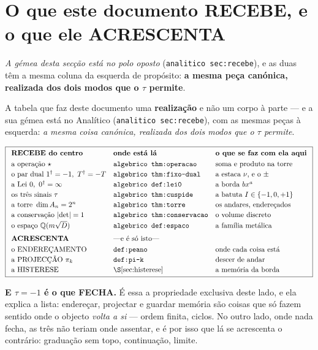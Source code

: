 \documentclass[11pt,a4paper]{article}
\newcommand{\abs}[1]{\lvert #1\rvert}
\newcommand{\dg}{^{\dagger}}
\newcommand{\code}[1]{\texttt{#1}}
\begin{document}
\section{O que este documento RECEBE, e o que ele ACRESCENTA}\label{sec:recebe}

\noindent\emph{A gémea desta secção está no polo oposto} (\code{analitico sec:recebe}), e as
duas têm a mesma coluna da esquerda de propósito: \textbf{a mesma peça canónica, realizada
dos dois modos que o $\tau$ permite}.


A tabela que faz deste documento uma \textbf{realização} e não um corpo à parte --- e a
sua gémea está no Analítico (\code{analitico sec:recebe}), com as mesmas peças à esquerda:
\emph{a mesma coisa canónica, realizada dos dois modos que o $\tau$ permite}.

\[
\boxed{
\begin{array}{lll}
\textbf{RECEBE do centro} & \textbf{onde está lá} & \textbf{o que se faz com ela aqui}\\[3pt]
\text{a operação }\star & \code{algebrico thm:operacao} & \text{soma e produto na torre}\\[2pt]
\text{o par dual } 1\dg=-1,\ T\dg=-T & \code{algebrico thm:fixo-dual} & \text{a estaca }\nu\text{, e o }\pm\\[2pt]
\text{a Lei 0},\ 0\dg=\infty & \code{algebrico def:lei0} & \text{a borda }bx^{a}\\[2pt]
\text{os três sinais }\tau & \code{algebrico thm:cuspide} & \text{a batuta }I\in\{-1,0,+1\}\\[2pt]
\text{a torre } \dim A_n=2^n & \code{algebrico thm:torre} & \text{os andares, endereçados}\\[2pt]
\text{a conservação }\abs{\det}=1 & \code{algebrico thm:conservacao} & \text{o volume discreto}\\[2pt]
\text{o espaço } \mathbb{Q}(m\sqrt D) & \code{algebrico def:espaco} & \text{a família metálica}\\[6pt]
\textbf{ACRESCENTA} & \multicolumn{2}{l}{\text{---e é só isto---}}\\[3pt]
\text{o ENDEREÇAMENTO} & \code{def:peano} & \text{onde cada coisa está}\\[2pt]
\text{a PROJECÇÃO } \pi_k & \code{def:pi-k} & \text{descer de andar}\\[2pt]
\text{a HISTERESE} & \S\ref{sec:histerese} & \text{a memória da borda}
\end{array}}
\]

\noindent\textbf{E $\tau=-1$ é o que FECHA.} É essa a propriedade exclusiva deste lado, e
ela explica a lista: endereçar, projectar e guardar memória são coisas que só fazem sentido
onde o objecto \emph{volta a si} --- ordem finita, ciclos. No outro lado, onde nada fecha,
as três não teriam onde assentar, e é por isso que lá se acrescenta o contrário: graduação
sem topo, continuação, limite.
\end{document}
